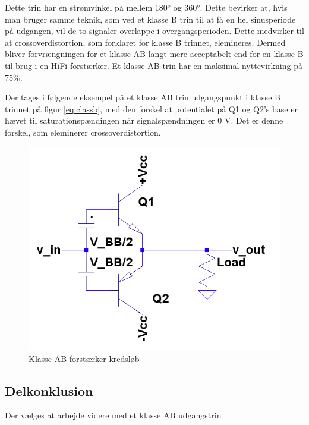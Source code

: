 Dette trin har en strømvinkel på mellem 180° og 360°. Dette bevirker at, hvis man bruger samme teknik, som ved et klasse B trin til at få en hel sinusperiode på udgangen, vil de to signaler overlappe i overgangsperioden. Dette medvirker til at crossoverdistortion, som forklaret for klasse B trinnet, elemineres. Dermed bliver forvrængningen for et klasse AB langt mere acceptabelt end for en klasse B til brug i en HiFi-forstærker.
Et klasse AB trin har en maksimal nyttevirkning på 75\%.

Der tages i følgende eksempel på et klasse AB trin udgangspunkt i klasse B trinnet på figur \ref{eq:classb}, med den forskel at potentialet på Q1 og Q2's base er hævet til saturationspændingen når signalspændningen er 0 V. Det er denne forskel, som eleminerer crossoverdistortion.


\begin{figure}[h]
\centering
\includegraphics[scale=.35]{indledende_analyse/klasser/classab.png}
\caption{Klasse AB forstærker kredsløb}
\label{fig:classab}
\end{figure}


\subsection{Delkonklusion}

Der vælges at arbejde videre med et klasse AB udgangstrin 
